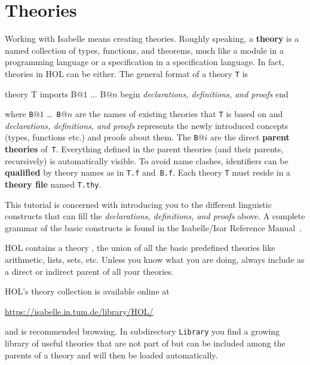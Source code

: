 \section{Theories}
\label{sec:Basic:Theories}

%
Working with Isabelle means creating theories. Roughly speaking, a
\textbf{theory} is a named collection of types, functions, and theorems,
much like a module in a programming language or a specification in a
specification language. In fact, theories in HOL can be either. The general
format of a theory \texttt{T} is
\begin{ttbox}
theory T
imports B\(@1\) \(\ldots\) B\(@n\)
begin
{\rmfamily\textit{declarations, definitions, and proofs}}
end
\end{ttbox}
where \texttt{B}$@1$ \dots\ \texttt{B}$@n$ are the names of existing
theories that \texttt{T} is based on and \textit{declarations,
    definitions, and proofs} represents the newly introduced concepts
(types, functions etc.) and proofs about them. The \texttt{B}$@i$ are the
direct \textbf{parent theories} of~\texttt{T}\@.
Everything defined in the parent theories (and their parents, recursively) is
automatically visible. To avoid name clashes, identifiers can be
\textbf{qualified}
by theory names as in \texttt{T.f} and~\texttt{B.f}. 
Each theory \texttt{T} must
reside in a \textbf{theory file} named \texttt{T.thy}.

This tutorial is concerned with introducing you to the different linguistic
constructs that can fill the \textit{declarations, definitions, and
    proofs} above.  A complete grammar of the basic
constructs is found in the Isabelle/Isar Reference
Manual~\cite{isabelle-isar-ref}.

\begin{warn}
  HOL contains a theory , the union of all the basic
  predefined theories like arithmetic, lists, sets, etc.  
  Unless you know what you are doing, always include 
  as a direct or indirect parent of all your theories.
\end{warn}
HOL's theory collection is available online at
\begin{center}\small
    \url{https://isabelle.in.tum.de/library/HOL/}
\end{center}
and is recommended browsing. In subdirectory \texttt{Library} you find
a growing library of useful theories that are not part of 
but can be included among the parents of a theory and will then be
loaded automatically.

